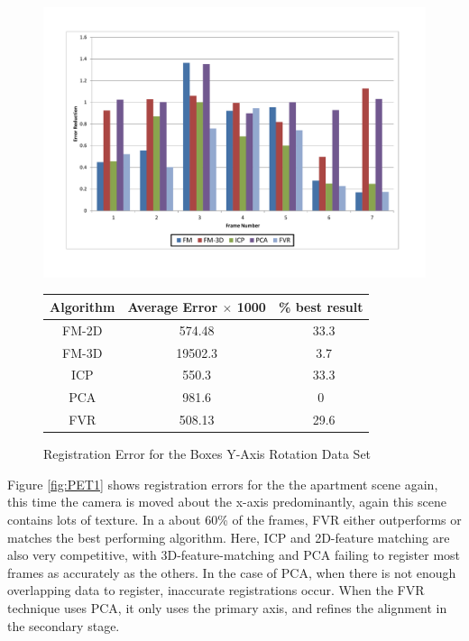 \begin{figure}
\centering
\includegraphics[width=6in]{images/results/Boxes_Texture_Rotate}
\caption{Registration Error for the Boxes Y-Axis Rotation Data Set}
\label{fig:PET2}

\begin{tabular}{ccc}
\hline
\textbf{Algorithm} & \textbf{Average Error $\times$ 1000} & \textbf{\% best result}\\ \hline
FM-2D	& 574.48 & ~33.3\\
FM-3D	& 19502.3 & ~3.7\\
ICP		& 550.3 & ~33.3\\
PCA		& 981.6 & 0\\
FVR		& 508.13 & ~29.6\\
\end{tabular}
\label{tab:PET2ST}
\end{figure} 


Figure \ref{fig:PET1} shows registration errors for the the apartment scene again, this time the camera is moved about the x-axis predominantly, again this scene contains lots of texture. In a about 60\% of the frames, FVR either outperforms or matches the best performing algorithm. Here, ICP and 2D-feature matching are also very competitive, with 3D-feature-matching and PCA failing to register most frames as accurately as the others. In the case of PCA, when there is not enough overlapping data to register, inaccurate registrations occur. When the FVR technique uses PCA, it only uses the primary axis, and refines the alignment in the secondary stage. \\

